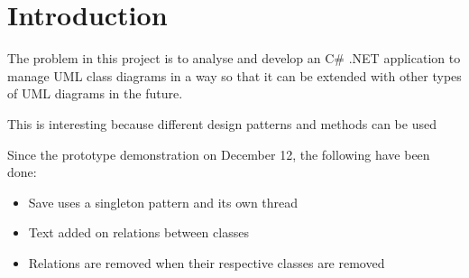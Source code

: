 \chapter{Introduction}
\label{sec:introduction}



The problem in this project is to analyse and develop an C\# .NET  application to manage UML class diagrams in a way so that it can be extended with other types of UML diagrams in the future.

This is interesting because different design patterns and methods can be used








Since the prototype demonstration on December 12, the following have been done:

\begin{itemize}
  \item Save uses a singleton pattern and its own thread
  \item Text added on relations between classes
  \item Relations are removed when their respective classes are removed
\end{itemize}